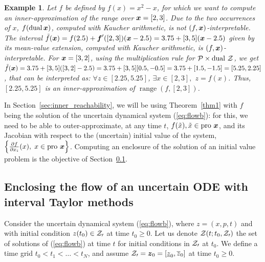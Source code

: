 \documentclass{sig-alternate-05-2015}
\newtheorem{example}{Example}
\DeclareMathOperator{\range}{range}
\newcommand{\dual}{\mbox{dual }}
\newcommand{\pro}{\mbox{pro }}
\begin{document}
\begin{example}
Let $f$ be defined by $f(x)=x^2-x$, for which we want to compute an inner-approximation of the range over $\x=[2,3]$. Due to the
two occurrences of $x$, $f(\mbox{dual}\, \x)$, computed with Kaucher arithmetic, 
is not  $(f,\x)$-interpretable. The interval $\tilde{f}(\x) = f(2.5) + \f'([2,3]) (\x - 2.5)=3.75 + [3,5](\x - 2.5)$
given by its mean-value extension, computed with Kaucher arithmetic, is $(f,\x)$-interpretable. 
For  $\x=[3,2]$, using the multiplication rule for ${\cal P} \times \dual {\cal Z}$, we get 
$\tilde{f}(\x) = 3.75 + [3,5]([3,2] - 2.5)=  3.75 + [3,5] [0.5,-0.5] = 3.75 + [1.5,-1.5] = [5.25,2.25]$, that can be interpreted 
as: $\forall z \in [2.25,5.25]$, $\exists x \in [2,3],$  $z=f(x)$. Thus, $[2.25,5.25]$ is an inner-approximation of $\range(f,[2,3])$.
\end{example}

In Section~\ref{sec:inner_reachability}, we will be using Theorem~\ref{thm1} with $f$ being the solution of the uncertain dynamical system 
(\ref{eq:flowb}): for this, we need to be able to outer-approximate, at any time $t$, $f(\tilde x), \tilde x \in \pro \x$, 
and its Jacobian with respect to the (uncertain) initial value of the system, $\left\{ \frac{\partial f}{\partial x_i} (x), \; x \in \pro \x \right\}$.
Computing an enclosure of the solution of an initial value problem is the objective of Section~\ref{sec:Taylor}.  

\subsection{Enclosing the flow of an uncertain ODE with interval Taylor methods}
\label{sec:Taylor}
Consider the uncertain dynamical system (\ref{eq:flowb}), where $z=(x,p,t)$ and with initial condition 
$z(t_0) \in {\cal Z_0}$ at time $t_0 \geq 0$. Let us denote ${\cal Z}(t;t_0, {\cal Z_0})$ the set of solutions of  (\ref{eq:flowb}) 
at time $t$ for initial conditions in ${\cal Z_0}$ at $t_0$. We define a time grid $t_0 < t_1 < \ldots < t_N$, and assume
${\cal Z_0} = \z_0=[\underline{z}_0,\overline{z}_0]$ at time $t_0 \geq 0$. 
\end{document}
